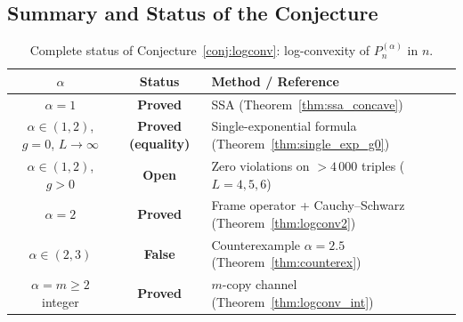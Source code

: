 \documentclass[12pt,a4paper]{article}
\begin{document}
\subsection{Summary and Status of the Conjecture}
\label{sec:logconv12_summary}

\begin{table}[h!]
\centering
\caption{Complete status of Conjecture~\ref{conj:logconv}: log-convexity of
$P_n^{(\alpha)}$ in $n$.}
\label{tab:logconv_complete}
\begin{tabular}{c|c|l}
$\alpha$ & Status & Method / Reference \\
\hline
$\alpha=1$ & \textbf{Proved} & SSA (Theorem~\ref{thm:ssa_concave}) \\
$\alpha\in(1,2)$, $g=0$, $L\to\infty$ & \textbf{Proved (equality)} & Single-exponential formula (Theorem~\ref{thm:single_exp_g0}) \\
$\alpha\in(1,2)$, $g>0$ & \textbf{Open} & Zero violations on $>4\,000$ triples ($L=4,5,6$) \\
$\alpha=2$ & \textbf{Proved} & Frame operator + Cauchy--Schwarz (Theorem~\ref{thm:logconv2}) \\
$\alpha\in(2,3)$ & \textbf{False} & Counterexample $\alpha=2.5$ (Theorem~\ref{thm:counterex}) \\
$\alpha=m\geq2$ integer & \textbf{Proved} & $m$-copy channel (Theorem~\ref{thm:logconv_int}) \\
\end{tabular}
\end{table}
\end{document}
